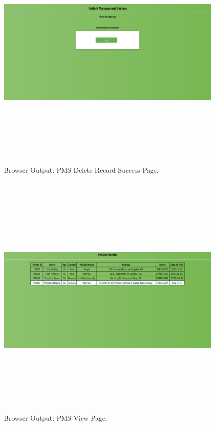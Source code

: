 \documentclass[12pt, a4]{article}
\begin{document}
\newpage
\subsection*{}
\begin{figure}[h]
\centering
\caption{Browser Output: PMS Delete Record Success Page.}
\includegraphics[height=12cm, width=16cm]{Output/PMSDeleteDone.png}
\end{figure}

\newpage
\subsection*{}
\begin{figure}[h]
\centering
\caption{Browser Output: PMS View Page.}
\includegraphics[height=12cm, width=16cm]{Output/PMSView2.png}
\end{figure}
\end{document}
